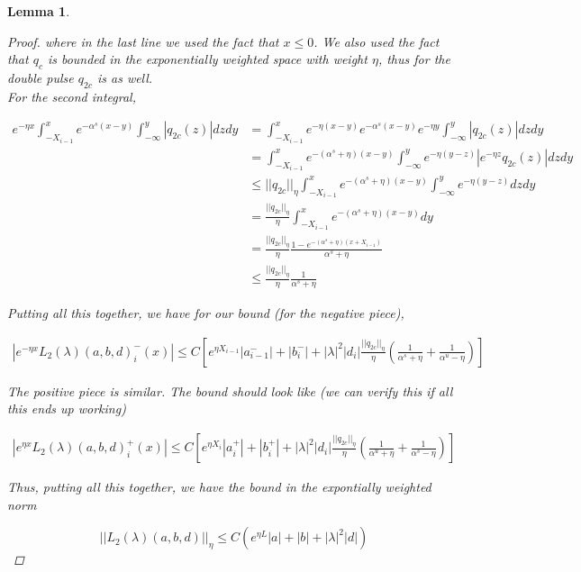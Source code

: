 \documentclass[12pt]{article}
\newtheorem{lemma}{Lemma}
\begin{document}
\begin{lemma}
\begin{proof}
where in the last line we used the fact that $x \leq 0$. We also used the fact that $q_c$ is bounded in the exponentially weighted space with weight $\eta$, thus for the double pulse $q_{2c}$ is as well.\\

For the second integral,

\begin{align*}
e^{-\eta x} \int_{-X_{i-1}}^x e^{-\alpha^s (x - y)}\int_{-\infty}^y |q_{2c}(z)| dz dy &=
\int_{-X_{i-1}}^x e^{-\eta (x-y)} e^{-\alpha^s (x - y)}e^{-\eta y}\int_{-\infty}^y |q_{2c}(z)| dz dy \\
&= \int_{-X_{i-1}}^x e^{-(\alpha^s + \eta) (x - y)}\int_{-\infty}^y e^{-\eta(y-z)} |e^{-\eta z} q_{2c}(z)| dz dy \\
&\leq ||q_{2c}||_\eta \int_{-X_{i-1}}^x e^{-(\alpha^s + \eta) (x - y)} \int_{-\infty}^y e^{-\eta(y-z)}  dz dy \\
&= \frac{ ||q_{2c}||_\eta }{\eta} \int_{-X_{i-1}}^x e^{-(\alpha^s + \eta) (x - y)} dy \\
&= \frac{ ||q_{2c}||_\eta }{\eta} \frac{1- e^{-(\alpha^s + \eta)(x + X_{i-1})}}{\alpha^s + \eta} \\
&\leq \frac{ ||q_{2c}||_\eta }{\eta} \frac{1}{\alpha^s + \eta}
\end{align*}

Putting all this together, we have for our bound (for the negative piece),

\begin{align*}
| e^{-\eta x} L_2(\lambda)(a, b, d)_i^-(x)| \leq C \left[ e^{\eta X_{i-1}}|a^-_{i-1}| + |b_i^-| + |\lambda|^2 |d_i|  \frac{ ||q_{2c}||_\eta }{\eta} \left( \frac{1}{\alpha^s + \eta} + \frac{1}{\alpha^u - \eta} \right)\right]
\end{align*}

The positive piece is similar. The bound should look like (we can verify this if all this ends up working)

\begin{align*}
| e^{\eta x} L_2(\lambda)(a, b, d)_i^+(x)| \leq C \left[ e^{\eta X_{i}}|a_i^+| + |b_i^+| + |\lambda|^2 |d_i|  \frac{ ||q_{2c}||_\eta }{\eta} \left( \frac{1}{\alpha^u + \eta} + \frac{1}{\alpha^s - \eta} \right)\right]
\end{align*}

Thus, putting all this together, we have the bound in the expontially weighted norm

\[
||L_2(\lambda)(a, b, d)||_\eta \leq C(e^{\eta L}|a| + |b| + |\lambda|^2 |d|)
\]


\end{proof}
\end{lemma}
\end{document}
